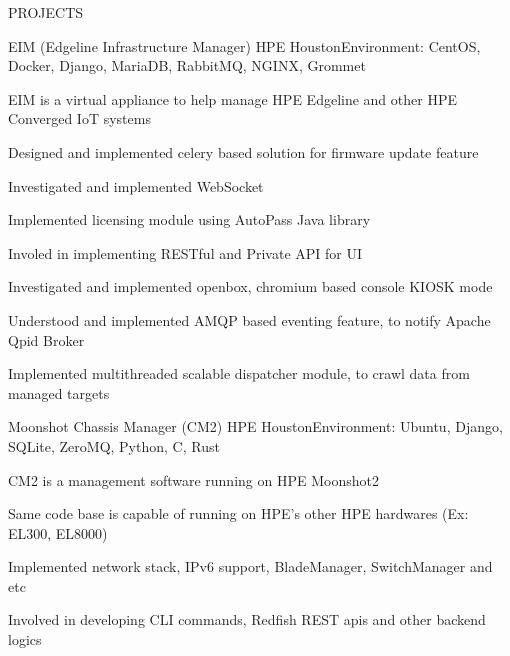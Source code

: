 \documentclass{resume} %
\begin{document}





\begin{rSection}{PROJECTS}


\begin{rSubsection}{EIM (Edgeline Infrastructure Manager)}
{HPE Houston}{Environment: CentOS, Docker, Django,  MariaDB, RabbitMQ, NGINX, Grommet}{ }  %

\vspace{-3pt}

\item EIM is a virtual appliance to help manage HPE Edgeline and other HPE Converged IoT systems
\item Designed and implemented celery based solution for firmware update feature
\item Investigated and implemented WebSocket
\item Implemented licensing module using AutoPass Java library
\item Involed in implementing RESTful and Private API for UI
\item Investigated and implemented openbox, chromium based console KIOSK mode
\item Understood and implemented AMQP based eventing feature, to notify Apache Qpid Broker
\item Implemented multithreaded scalable dispatcher module, to crawl data from managed targets

\end{rSubsection}


\begin{rSubsection}{Moonshot Chassis Manager (CM2)}
{HPE Houston}{Environment: Ubuntu, Django,  SQLite, ZeroMQ, Python, C, Rust}{ }  %

\vspace{-3pt}

\item CM2 is a management software running on HPE Moonshot2
\item Same code base is capable of running on HPE's other HPE hardwares (Ex: EL300, EL8000)
\item Implemented network stack, IPv6 support, BladeManager, SwitchManager and etc
\item Involved in developing CLI commands, Redfish REST apis and other backend logics



\end{rSubsection}
\end{rSection}
\end{document}
